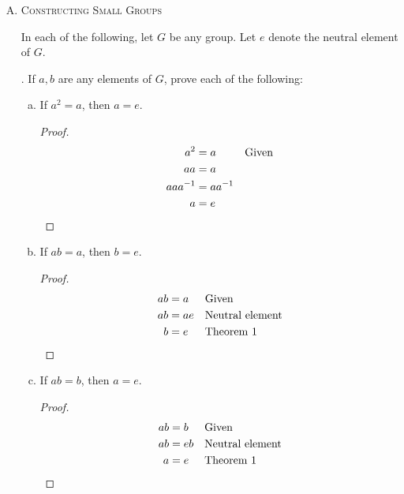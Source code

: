 \documentclass[twoside]{amsart}
\begin{document}
\begin{enumerate}[A.]
   . If there is exactly one $x \ne e$ in $G$ such that
   $x=x^{-1}$, then $a_1a_2 \cdots a_n = x$.

   \begin{proof}
   Observe that there must be an even number of elements. There is
   $e$ and $x$ and then an even number of elements that are not 
   equal to their own inverse (by E1). By commuatitive property, we
   can align all the pairs next to each other and they all simplify to
   $e$. That leaves $x$.
   \end{proof}

   \item \textsc{Constructing Small Groups}

   \noindent In each of the following, let $G$ be any group. Let $e$ denote 
   the neutral element of $G$.

   . If $a,b$ are any elements of $G$, prove each of the 
   following:

   \begin{enumerate}[(a)]
      \item If $a^2 = a$, then $a=e$.
      \begin{proof}
      \begin{align*}
         a^2 & = a && \text{Given} \\
	 aa  & = a && \\
	 aaa^{-1} & = aa^{-1} \\
	 a   & = e \qedhere
      \end{align*}
      \end{proof}
      
      \item If $ab=a$, then $b=e$.
      \begin{proof}
         \begin{align*}
	    ab & = a   && \text{Given} \\
	    ab & = ae  && \text{Neutral element} \\
	    b & = e    && \text{Theorem 1} \qedhere
	 \end{align*}
      \end{proof}

      \item If $ab=b$, then $a=e$.
      \begin{proof}
         \begin{align*}
	    ab & = b   && \text{Given} \\
	    ab & = eb  && \text{Neutral element} \\
	    a  & = e   && \text{Theorem 1} \qedhere
	 \end{align*}
      \end{proof}


\end{enumerate}
\end{enumerate}
\end{document}

